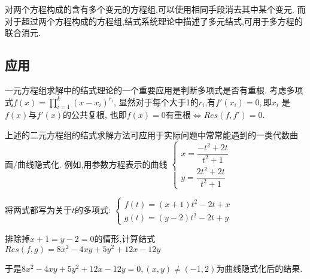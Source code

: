 	对两个方程构成的含有多个变元的方程组,可以使用相同手段消去其中某个变元.
	而对于超过两个方程构成的方程组,结式系统理论中描述了多元结式,可用于多方程的联合消元.

\subsection{应用}
	一元方程组求解中的结式理论的一个重要应用是判断多项式是否有重根.
	考虑多项式$ f(x) = \prod_{i=1}^{k}{(x-x_i)^{r_i}}$,
	显然对于每个大于1的$ r_i$,有$ f'(x_i) = 0,$即$ x_i $ 是$f(x)$与$ f'(x)$的公共复根,
	也即$ f(x)=0$有重根$ \Leftrightarrow Res(f,f')=0$.

	上述的二元方程组的结式求解方法可应用于实际问题中常常能遇到的一类代数曲面/曲线隐式化.
	例如,用参数方程表示的曲线
	$ \begin{cases}x=\dfrac{-t^2+2t}{t^2+1} \\ y=\dfrac{2t^2+2t}{t^2+1} \end{cases}$

	将两式都写为关于$ t$的多项式: 
	$\begin{cases}f(t)=(x+1)t^2 -2t +x\\ g(t)=(y-2)t^2-2t+y \end{cases}$

	排除掉$ x+1=y-2=0$的情形,计算结式$ Res(f,g)= 8x^2-4xy+5y^2+12x-12y$ 
	
	于是$8x^2-4xy+5y^2+12x-12y=0,(x,y) \ne (-1,2)$为曲线隐式化后的结果.
